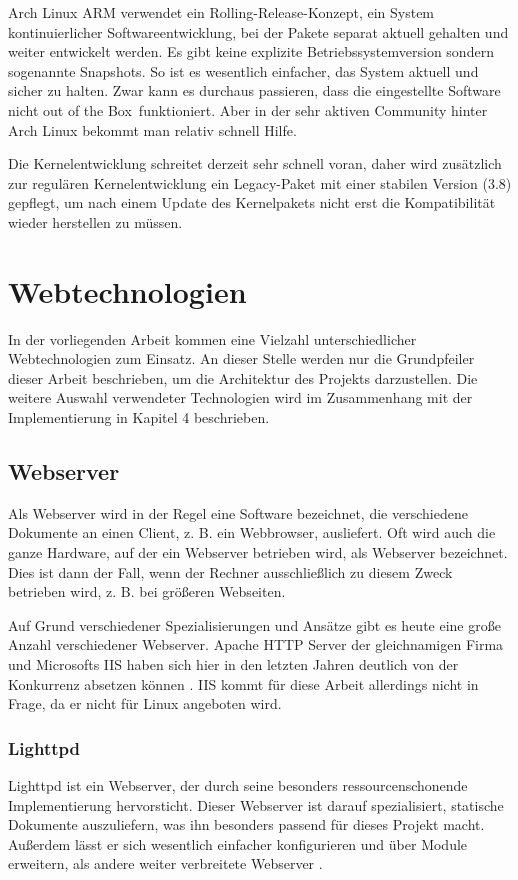 \documentclass[thesis.tex]{subfiles}
\begin{document}
Arch Linux ARM verwendet ein Rolling-Release-Konzept, ein System kontinuierlicher Softwareentwicklung, bei der Pakete separat aktuell gehalten und weiter entwickelt werden. Es gibt keine explizite Betriebssystemversion sondern sogenannte Snapshots. So ist es  wesentlich einfacher, das System aktuell und sicher zu halten. Zwar kann es durchaus passieren, dass die eingestellte Software nicht \glqq out of the Box\grqq ~funktioniert. Aber in der sehr aktiven Community hinter Arch Linux bekommt man relativ schnell Hilfe.

Die Kernelentwicklung schreitet derzeit sehr schnell voran, daher wird zusätzlich zur regulären Kernelentwicklung ein Legacy-Paket mit einer stabilen Version (3.8) gepflegt, um nach einem Update des Kernelpakets nicht erst die Kompatibilität wieder herstellen zu müssen.


\section{Webtechnologien}
In der vorliegenden Arbeit kommen eine Vielzahl unterschiedlicher Webtechnologien zum Einsatz. An dieser Stelle werden nur die Grundpfeiler dieser Arbeit beschrieben, um die Architektur des Projekts darzustellen. Die weitere Auswahl verwendeter Technologien wird im Zusammenhang mit der Implementierung in Kapitel 4 beschrieben.

\subsection{Webserver}
Als Webserver wird in der Regel eine Software bezeichnet, die verschiedene Dokumente an einen Client, z. B. ein Webbrowser, ausliefert. Oft wird auch die ganze Hardware, auf der ein Webserver betrieben wird, als Webserver bezeichnet. Dies ist dann der Fall, wenn der Rechner ausschließlich zu diesem Zweck betrieben wird, z. B. bei größeren Webseiten.

Auf Grund verschiedener Spezialisierungen und Ansätze gibt es heute eine große Anzahl verschiedener Webserver. Apache HTTP Server der gleichnamigen Firma und Microsofts IIS haben sich hier in den letzten Jahren deutlich von der Konkurrenz absetzen können \cite{webserversurvey1014}. IIS kommt für diese Arbeit allerdings nicht in Frage, da er nicht für Linux angeboten wird.

\subsubsection{Lighttpd}
Lighttpd ist ein Webserver, der durch seine besonders ressourcenschonende Implementierung hervorsticht. Dieser Webserver ist darauf spezialisiert, statische Dokumente auszuliefern, was ihn besonders passend für dieses Projekt macht. Außerdem lässt er sich wesentlich einfacher konfigurieren und über Module erweitern, als andere weiter verbreitete Webserver \cite{krieg2009}.
\end{document}
